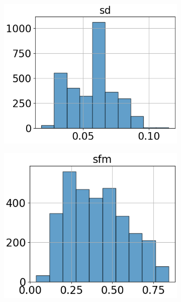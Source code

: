 \begin{figure}[htbp]
\begin{subfigure}[t]{.24\textwidth}
        \includegraphics[width=\linewidth]{../../python_code/plots/logistic_regression/histogram-sd.png}
    \end{subfigure}
    \begin{subfigure}[t]{.24\textwidth}
        \centering 
        \includegraphics[width=\linewidth]{../../python_code/plots/logistic_regression/histogram-sfm.png}
    \end{subfigure}
    \begin{subfigure}[t]{.24\textwidth}
        \centering 

\end{subfigure}
\end{figure}

